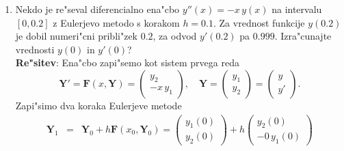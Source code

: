 \begin{enumerate}
$$\begin{array}{rrrrr}
        \vdots & \vdots&\ddots&\ddots&\vdots\\
        0&0&\cdots&-\frac{1}{x}&1
      \end{array}\right)
  $$
  in
  $$
      U= \left(
      \begin{array}{rrrr}
        x & 0  & \cdots &a_0\\
        0 & x  & \cdots &a_1+\frac{a_0}{x}\\
        \vdots  & \vdots & \ddots &\vdots\\
        0 & 0 &\cdots &x+\frac{a_{n-1}}{x}+\cdots+\frac{a_0}{x^n}
      \end{array}\right).
   $$
   Torej je 
   \begin{eqnarray*}
     \det A=\det U&=&x^n\left(x+\frac{a_{n-1}}{x}+\cdots
     +\frac{a_0}{x^n}\right)\\
     &=&x^{n+1}+a_{n-1}x^{n-1}+\cdots +a_1 x+a_0.
   \end{eqnarray*}
  \item Nekdo je re"seval diferencialno ena"cbo $y''(x)=-x\,y(x)$ 
    na intervalu $[0,0.2]$ z Eulerjevo metodo s korakom $h=0.1$.
    Za vrednost funkcije $y(0.2)$ je dobil numeri"cni pribli"zek $0.2$,
    za odvod $y'(0.2)$ pa $0.999$. Iz\-ra\-"cu\-najte vrednosti 
    $y(0)$ in $y'(0)$?\\
    {\bf Re"sitev}: Ena"cbo zapi"semo kot sistem prvega reda
    $$\mathbf{Y}'=\mathbf{F}(x,\mathbf{Y})=\left(
    \begin{array}{r}
      y_2\\
      -x\,y_1
    \end{array}\right),\quad \mathbf{Y}=
    \left(
    \begin{array}{r}
      y_1\\
      y_2
    \end{array}\right)=
    \left(
    \begin{array}{r}
      y\\
      y'
    \end{array}\right).
    $$
    Zapi"simo dva koraka Eulerjeve metode
    \begin{eqnarray*}
      \mathbf{Y}_1&=&\mathbf{Y}_0+h\mathbf{F}(x_0,\mathbf{Y}_0)=
    \left(
    \begin{array}{r}
      y_1(0)\\
      y_2(0)
    \end{array}\right)+
    h
    \left(
    \begin{array}{r}
      y_2(0)\\
      -0\,y_1(0)
    \end{array}\right)\\

\end{eqnarray*}
\end{enumerate}
